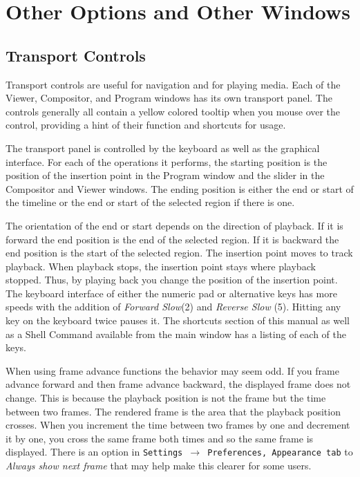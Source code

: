 \section{Other Options and Other Windows}%
\label{sec:other_options_and_other_windows}

\subsection{Transport Controls}%
\label{sub:transport_controls}

Transport controls are useful for navigation and for playing media.  
Each of the Viewer, Compositor, and Program windows has its own transport panel.  
The controls generally all contain a yellow colored tooltip when you mouse over the control, providing a hint of their function and shortcuts for usage.

The transport panel is controlled by the keyboard as well as the graphical interface. 
For each of the operations it performs, the starting position is the position of the insertion point in the Program window and the slider in the Compositor and Viewer windows. 
The ending position is either the end or start of the timeline or the end or start of the selected region if there is one.

The orientation of the end or start depends on the direction of playback. 
If it is forward the end position is the end of the selected region. 
If it is backward the end position is the start of the selected region.  
The insertion point moves to track playback. 
When playback stops, the insertion point stays where playback stopped. 
Thus, by playing back you change the position of the insertion point. 
The keyboard interface of either the numeric pad or alternative keys has more speeds with the addition of \emph{Forward Slow}(2) and \emph{Reverse Slow} (5).  
Hitting any key on the keyboard twice pauses it. 
The shortcuts section of this manual as well as a Shell Command available from the \CGG{} main window has a listing of each of the keys.

When using frame advance functions the behavior may seem odd. 
If you frame advance forward and then frame advance backward, the displayed frame does not change. 
This is because the playback position is not the frame but the time between two frames. 
The rendered frame is the area that the playback position crosses. 
When you increment the time between two frames by one and decrement it by one, you cross the same frame both times and so the same frame is displayed.  
There is an option in \texttt{Settings $\rightarrow$ Preferences, Appearance tab} to \textit{Always show next frame} that may help make this clearer for some users.

